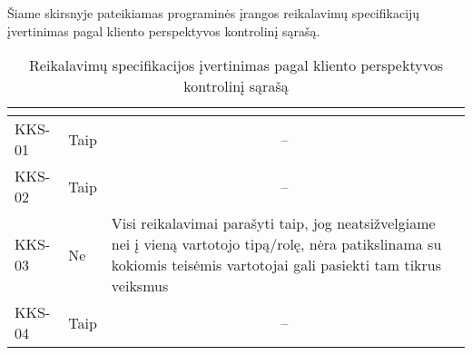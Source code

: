 \documentclass{VUMIFPSkursinis}
\begin{document}
Šiame skirsnyje pateikiamas programinės įrangos reikalavimų specifikacijų įvertinimas pagal kliento perspektyvos kontrolinį sąrašą.
\begin{center}

	\begin{longtable}{|C{2cm}|L{2.5cm}|L{10cm}|}

		\caption{Reikalavimų specifikacijos įvertinimas pagal kliento perspektyvos kontrolinį sąrašą}
		\label{table:KKS}

		\\ \hline
		 &
		 &
		\\ \hline
		KKS-01                                          &
		Taip                                            &
		\\ \hline
		
		KKS-02                                          &
		Taip                                            &
		\\ \hline

		KKS-03                                          &
		Ne                                            &
		Visi reikalavimai parašyti taip, jog neatsižvelgiame nei į vieną vartotojo tipą/rolę, nėra patikslinama su kokiomis teisėmis vartotojai gali pasiekti tam tikrus veiksmus
		\\ \hline

		KKS-04                                          &
		Taip                                              &
		\\ \hline


\end{longtable}
\end{center}
\end{document}
